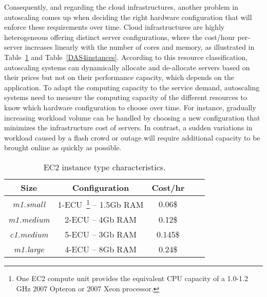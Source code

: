 Consequently, and regarding the cloud infrastructures, another problem in autoscaling comes up when deciding the right hardware configuration that will enforce these requirements over time. Cloud infrastructures are highly heterogeneous offering distinct server configurations, where the cost/hour per-server increases linearly with the number of cores and memory, as illustrated in Table~\ref{EC2instances} and Table~\ref{DAS4instances}. According to this resource classification, autoscaling systems can dynamically allocate and de-allocate servers based on their prices but not on their performance capacity, which depends on the application. 
To adapt the computing capacity to the service demand, autoscaling systems need to measure the computing capacity of the different resources to know which hardware configuration to choose over time. For instance, gradually increasing workload volume can be handled by choosing a new configuration that minimizes the infrastructure cost of servers. In contrast, a sudden variations in workload caused by a flash crowd or outage will require additional capacity to be brought online as quickly as possible. 

\begin{table}[t]
  {\scriptsize 
\begin{center}
    \begin{tabular}{  | c | c | c | c | c |}
    \hline
      \textbf{Size}  & \textbf{Configuration} & \textbf{Cost/hr} \\ \hline
   \textit{m1.small}   & 1-ECU~\footnote{One EC2 compute unit provides the equivalent CPU capacity of a 1.0-1.2 GHz 2007 Opteron or 2007 Xeon processor.}  -- 1.5Gb RAM&  0.06\$ \\ \hline
   \textit{m1.medium}   & 2-ECU -- 4Gb RAM&  0.12\$ \\ \hline
\textit{c1.medium} & 5-ECU -- 3Gb RAM& 0.145\$   \\ \hline
\textit{m1.large} & 4-ECU -- 8Gb RAM& 0.24\$   \\ \hline
 \end{tabular}
\end{center}
\caption{EC2 instance type characteristics.}
\label{EC2instances}
}
\end{table}

